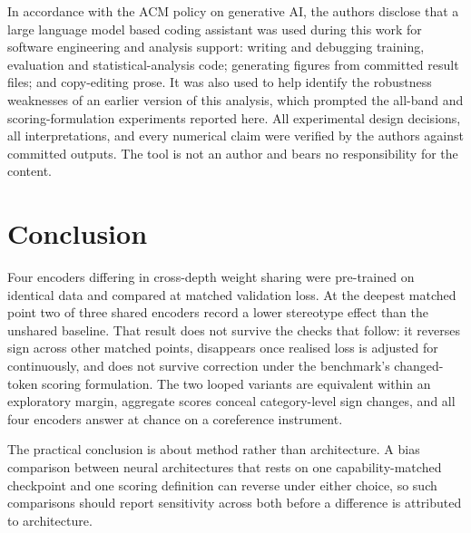 \documentclass[sigconf,natbib=true,anonymous=true]{acmart}
\begin{document}
In accordance with the ACM policy on generative AI, the authors disclose that a
large language model based coding assistant was used during this work for
software engineering and analysis support: writing and debugging training,
evaluation and statistical-analysis code; generating figures from committed
result files; and copy-editing prose. It was also used to help identify the
robustness weaknesses of an earlier version of this analysis, which prompted the
all-band and scoring-formulation experiments reported here. All experimental
design decisions, all interpretations, and every numerical claim were verified by
the authors against committed outputs. The tool is not an author and bears no
responsibility for the content.

\section{Conclusion}

Four encoders differing in cross-depth weight sharing were pre-trained on
identical data and compared at matched validation loss. At the deepest matched
point two of three shared encoders record a lower stereotype effect than the
unshared baseline. That result does not survive the checks that follow: it
reverses sign across other matched points, disappears once realised loss is
adjusted for continuously, and does not survive correction under the benchmark's
changed-token scoring formulation. The two looped variants are equivalent within
an exploratory margin, aggregate scores conceal category-level sign changes, and
all four encoders answer at chance on a coreference instrument.

The practical conclusion is about method rather than architecture. A bias
comparison between neural architectures that rests on one capability-matched
checkpoint and one scoring definition can reverse under either choice, so such
comparisons should report sensitivity across both before a difference is
attributed to architecture.



\end{document}
